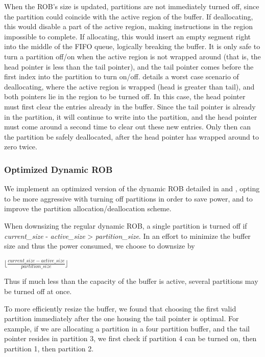 When the ROB's size is updated, partitions are not immediately turned off, since the partition could coincide with the active region of the buffer. If deallocating, this would disable a part of the active region, making instructions in the region impossible to complete. If allocating, this would insert an empty segment right into the middle of the FIFO queue, logically breaking the buffer. It is only safe to turn a partition off/on when the active region is not wrapped around (that is, the head pointer is less than the tail pointer), and the tail pointer comes before the first index into the partition to turn on/off. \cite{kucuk3} details a worst case scenario of deallocating, where the active region is wrapped (head is greater than tail), and both pointers lie in the region to be turned off. In this case, the head pointer must first clear the entries already in the buffer. Since the tail pointer is already in the partition, it will continue to write into the partition, and the head pointer must come around a second time to clear out these new entries. Only then can the partition be safely deallocated, after the head pointer has wrapped around to zero twice.

\subsubsection{Optimized Dynamic ROB}
We implement an optimized version of the dynamic ROB detailed in \cite{kucuk2} and \cite{kucuk3}, opting to be more aggressive with turning off partitions in order to save power, and to improve the partition allocation/deallocation scheme.

When downsizing the regular dynamic ROB, a single partition is turned off if {\it current\_size} - {\it active\_size} > {\it partition\_size}. In an effort to minimize the buffer size and thus the power consumed, we choose to downsize by

\begin{center}
$\lfloor \frac{current\_size - active\_size}{partition\_size} \rfloor$
\end{center}

Thus if much less than the capacity of the buffer is active, several partitions may be turned off at once.

To more efficiently resize the buffer, we found that choosing the first valid partition immediately after the one housing the tail pointer is optimal. For example, if we are allocating a partition in a four partition buffer, and the tail pointer resides in partition 3, we first check if partition 4 can be turned on, then partition 1, then partition 2.


